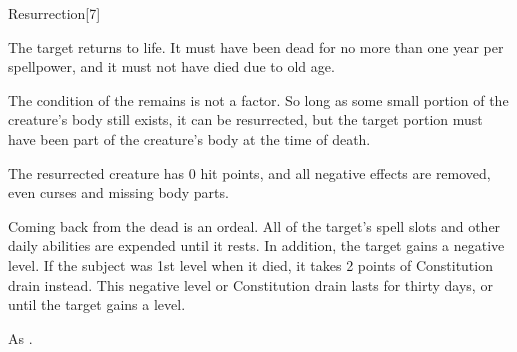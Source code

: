 \begin{spellsection}{Resurrection}[7]
    \begin{spellheader}
    \end{spellheader}
    \begin{spellcontent}
        \begin{spelltargetinginfo}
        \end{spelltargetinginfo}
        \begin{spelleffects}

            \spelleffect The target returns to life. It must have been dead for no more than one year per spellpower, and it must not have died due to old age.

            The condition of the remains is not a factor. So long as some small portion of the creature's body still exists, it can be resurrected, but the target portion must have been part of the creature's body at the time of death. 

            The resurrected creature has 0 hit points, and all negative effects are removed, even curses and missing body parts.

            \par Coming back from the dead is an ordeal. All of the target's spell slots and other daily abilities are expended until it rests. In addition, the target gains a negative level. If the subject was 1st level when it died, it takes 2 points of Constitution drain instead. This negative level or Constitution drain lasts for thirty days, or until the target gains a level.
        \end{spelleffects}
    \end{spellcontent}
    \begin{spellfooter}
        \spellnotes As .
    \end{spellfooter}
\end{spellsection}

